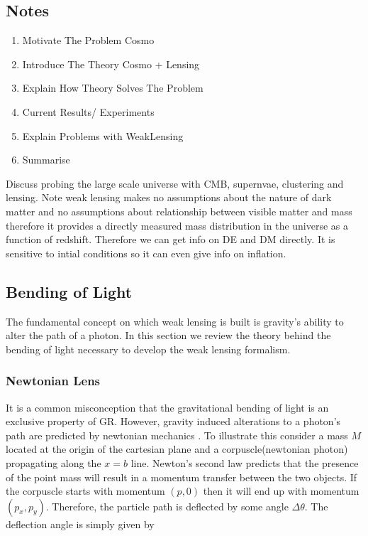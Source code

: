 \subsection{Notes}
\begin{enumerate}
    \item Motivate The Problem Cosmo
    \item Introduce The Theory Cosmo + Lensing
    \item Explain How Theory Solves The Problem
    \item Current Results/ Experiments
    \item Explain Problems with WeakLensing
    \item Summarise
\end{enumerate}

Discuss probing the large scale universe with CMB, supernvae, clustering
and lensing. 
Note weak lensing makes no assumptions about the nature of dark matter
and no assumptions about relationship between visible matter and mass therefore
it provides a directly measured mass distribution in the universe as a function of 
redshift. Therefore we can get info on DE and DM directly. It is sensitive to intial
conditions so it can even give info on inflation. 


\subsection{Bending of Light}
The fundamental concept on which weak lensing is built is gravity's ability to alter the path of a photon.
In this section we review the theory behind the bending of light necessary to develop the weak lensing formalism.
\subsubsection{Newtonian Lens}

It is a common misconception that the gravitational bending of light is an exclusive property of GR.
However, gravity induced alterations to a photon's path are predicted by newtonian mechanics \cite{lensingbook}. To illustrate this 
consider a mass $M$ located at the origin of the cartesian plane and a corpuscle(newtonian photon) 
propagating along the $x=b$ line. 
Newton's second law predicts that the presence of the point mass will result in a momentum transfer
between the two objects. If the corpuscle starts with 
momentum $(p,0)$ then it will end up with momentum $(p_x,p_y)$.
Therefore, the particle path is deflected by some angle $\Delta \theta$. The deflection angle is 
simply given by 

